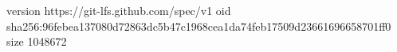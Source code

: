 version https://git-lfs.github.com/spec/v1
oid sha256:96febea137080d72863dc5b47c1968cea1da74feb17509d23661696658701ff0
size 1048672
